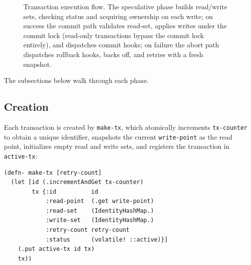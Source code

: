 \begin{figure}[H]
  \caption{Transaction execution flow. The speculative phase builds read/write
    sets, checking status and acquiring ownership on each write; on success
    the commit path validates read-set, applies writes under the commit lock
    (read-only transactions bypass the commit lock entirely), and dispatches
    commit hooks; on failure the abort path dispatches rollback hooks, backs off,
    and retries with a fresh snapshot.}
  \label{fig:tx-flow}
\end{figure}

The subsections below walk through each phase.

\subsection{Creation}

Each transaction is created by \texttt{make-tx}, which atomically increments
\texttt{tx-counter} to obtain a unique identifier, snapshots the current
\texttt{write-point} as the read point, initializes empty read and write sets,
and registers the transaction in \texttt{active-tx}:

\begin{listing}[H]
  \begin{verbatim}
(defn- make-tx [retry-count]
  (let [id (.incrementAndGet tx-counter)
        tx {:id          id
            :read-point  (.get write-point)
            :read-set    (IdentityHashMap.)
            :write-set   (IdentityHashMap.)
            :retry-count retry-count
            :status      (volatile! ::active)}]
    (.put active-tx id tx)
    tx))
\end{verbatim}
  \caption{Transaction creation. The read point is snapshotted at creation
    time, defining the consistent view of memory this transaction will observe.}
  \label{lst:make-tx}
\end{listing}

